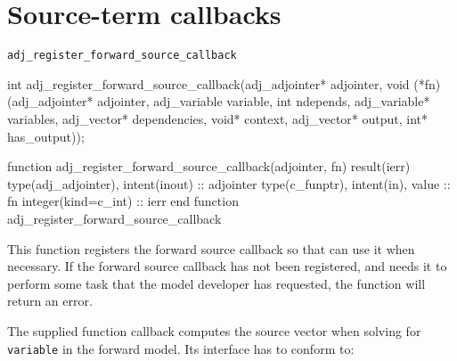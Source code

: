 \section{Source-term callbacks}
\begin{boxwithtitle}{\texttt{adj_register_forward_source_callback}}
\begin{minipage}{\columnwidth}
\begin{ccode}
  int adj_register_forward_source_callback(adj_adjointer* adjointer, 
                   void (*fn)(adj_adjointer* adjointer, adj_variable variable, 
                              int ndepends, adj_variable* variables, 
                              adj_vector* dependencies, void* context, 
                              adj_vector* output, int* has_output));
\end{ccode}
\begin{fortrancode}
  function adj_register_forward_source_callback(adjointer, fn) 
                                                     result(ierr) 
    type(adj_adjointer), intent(inout) :: adjointer
    type(c_funptr), intent(in), value :: fn
    integer(kind=c_int) :: ierr
  end function adj_register_forward_source_callback
\end{fortrancode}
\end{minipage}
\end{boxwithtitle}
This function registers the forward source callback so that \libadjoint can use it when necessary. 
If the forward source callback has not been registered, and \libadjoint needs it to perform some task that the model developer has
requested, the function will return an  error.

The supplied function callback computes the source vector when solving for \texttt{variable} in the forward model.
Its interface has to conform to:

